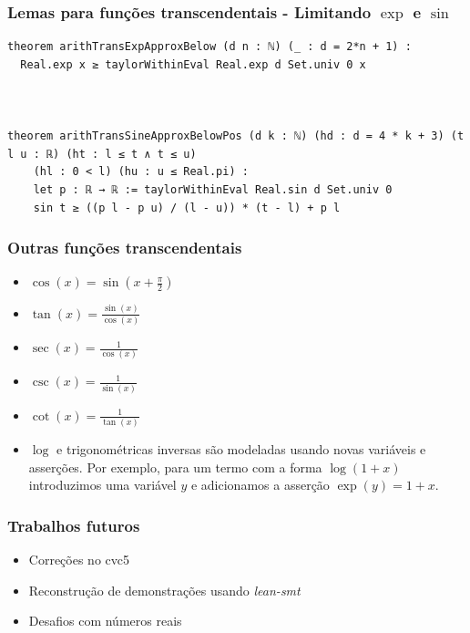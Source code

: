 \documentclass[usepdftitle=false,aspectratio=169,usenames,dvipsnames]{beamer}
\newcommand\vitem{\vfill\item}
\begin{document}
\begin{frame}[fragile]
  \frametitle{Lemas para funções transcendentais - Limitando $\exp$ e $\sin$}
\begin{lstlisting}
theorem arithTransExpApproxBelow (d n : ℕ) (_ : d = 2*n + 1) :
  Real.exp x ≥ taylorWithinEval Real.exp d Set.univ 0 x



theorem arithTransSineApproxBelowPos (d k : ℕ) (hd : d = 4 * k + 3) (t l u : ℝ) (ht : l ≤ t ∧ t ≤ u)
    (hl : 0 < l) (hu : u ≤ Real.pi) :
    let p : ℝ → ℝ := taylorWithinEval Real.sin d Set.univ 0
    sin t ≥ ((p l - p u) / (l - u)) * (t - l) + p l
\end{lstlisting}
\end{frame}

\begin{frame}
  \frametitle{Outras funções transcendentais}
  \begin{itemize}
    \item $\cos(x) = \sin(x + \frac{\pi}{2})$
    \vitem $\tan(x) = \frac{\sin(x)}{\cos(x)}$
    \vitem $\sec(x) = \frac{1}{\cos(x)}$
    \vitem $\csc(x) = \frac{1}{\sin(x)}$
    \vitem $\cot(x) = \frac{1}{\tan(x)}$
    \vitem $\log$ e trigonométricas inversas são modeladas usando novas variáveis e asserções. Por exemplo, para um termo com a forma $\log(1 + x)$ introduzimos uma variável $y$ e adicionamos a asserção $\exp(y) = 1 + x$.
  \end{itemize}
\end{frame}

\begin{frame}
  \frametitle{Trabalhos futuros}
  \begin{itemize}
    \item Correções no cvc5
    \vitem Reconstrução de demonstrações usando \textit{lean-smt}
    \vitem Desafios com números reais
  \end{itemize}
\end{frame}
\end{document}

